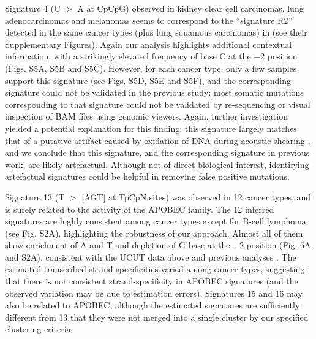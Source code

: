 \documentclass[10pt,letterpaper]{article}
\begin{document}
Signature 4 (C $>$ A at CpCpG) observed in kidney clear cell carcinomas, lung adenocarcinomas and melanomas 
seems to correspond to the ``signature R2''  detected in the same cancer types (plus lung squamous carcinomas) in 
\cite{pmid23318258} (see their Supplementary Figures).
Again our analysis highlights additional contextual information, with a strikingly elevated frequency of base C at the $-2$ position (Figs. S5A, S5B and S5C).
However, for each cancer type, only a few samples support this signature (see Figs. S5D, S5E and S5F),
and the corresponding signature 
could not be validated in the previous study: most somatic mutations corresponding to that signature could not be validated by re-sequencing or visual inspection of BAM files using genomic viewers. Again, further investigation
yielded a potential explanation for this finding:
this signature largely matches that of a putative artifact caused by oxidation of DNA during acoustic shearing \cite{pmid23303777}, 
and we conclude that this signature, and the corresponding signature in previous work, are likely artefactual.
Although not of direct biological interest,
identifying artefactual signatures could be helpful in removing false positive mutations.

Signature 13 (T $>$ [AGT] at TpCpN sites) was observed in 12 cancer types, and is surely related to the activity of the APOBEC family. The 12 inferred signatures are highly consistent among cancer types except for B-cell lymphoma (see Fig. S2A), highlighting the robustness
of our approach.  Almost all of them show enrichment of A and T and depletion of G base at the $-2$ position (Fig. 6A and S2A), 
consistent with the UCUT data above and previous analyses \cite{pmid23318258}.
The estimated transcribed strand specificities varied among cancer types, suggesting that there is not consistent strand-specificity in APOBEC signatures (and the observed variation may be due to estimation errors).
Signatures 15 and 16 may also be related to APOBEC, although the estimated signatures are sufficiently different from 13 that they
were not merged into a single 
cluster by our specified clustering criteria.
\end{document}
